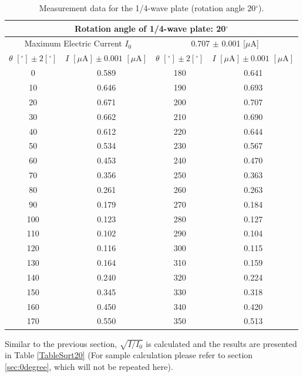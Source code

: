 \documentclass{article}
\begin{document}
\begin{table}[H]\centering
\begin{tabular}{cc||cc}
\multicolumn{4}{c}{Rotation angle of 1/4-wave plate: 20$^\circ$}\\
\toprule
\multicolumn{2}{c}{Maximum Electric Current $I_0$} & \multicolumn{2}{c}{0.707 $\pm$ 0.001 [$\mu$A]}\\
\midrule
$\theta\,\,[^\circ] \pm 2[^\circ]$ & $I\,\,[\mu\text{A}] \pm 0.001\,\,[\mu\text{A}]$ & $\theta\,\,[^\circ] \pm 2[^\circ]$ & $I\,\,[\mu\text{A}] \pm 0.001\,\,[\mu\text{A}]$\\
\midrule
    0     & 0.589 & 180   & 0.641 \\
    10    & 0.646 & 190   & 0.693 \\
    20    & 0.671 & 200   & 0.707 \\
    30    & 0.662 & 210   & 0.690 \\
    40    & 0.612 & 220   & 0.644 \\
    50    & 0.534 & 230   & 0.567 \\
    60    & 0.453 & 240   & 0.470 \\
    70    & 0.356 & 250   & 0.363 \\
    80    & 0.261 & 260   & 0.263 \\
    90    & 0.179 & 270   & 0.184 \\
    100   & 0.123 & 280   & 0.127 \\
    110   & 0.102 & 290   & 0.104 \\
    120   & 0.116 & 300   & 0.115 \\
    130   & 0.164 & 310   & 0.159 \\
    140   & 0.240 & 320   & 0.224 \\
    150   & 0.345 & 330   & 0.318 \\
    160   & 0.450 & 340   & 0.420 \\
    170   & 0.550 & 350   & 0.513 \\
\bottomrule
\end{tabular}
\caption{Measurement data for the 1/4-wave plate (rotation angle 20$^\circ$).}\label{Table1/420}
\end{table}

Similar to the previous section, $\sqrt{I/I_0}$ is calculated and the results are presented in Table \ref{TableSqrt20} (For sample calculation please refer to section \ref{sec:0degree}, which will not be repeated here).
\end{document}

